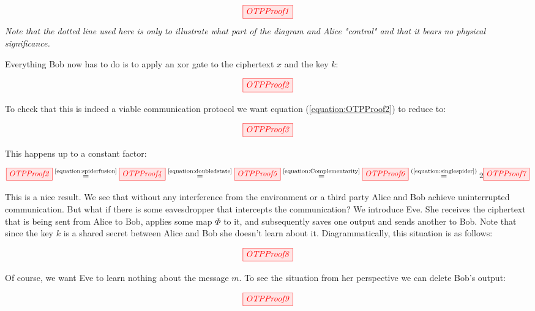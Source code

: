 \documentclass[]{article}
\newcommand{\equaltext}[1]{\ensuremath{\stackrel{\text{#1}}{=}}}
\begin{document}
\begin{equation}
	\tikzfig{OTPProof1}
\end{equation}
\textit{Note that the dotted line used here is only to illustrate what part of the diagram and Alice "control" and that it bears no physical significance.}


Everything Bob now has to do is to apply an xor gate to the ciphertext $x$ and the key $k$:

\begin{equation}
\label{equation:OTPProof2}
\tikzfig{OTPProof2}
\end{equation}

To check that this is indeed a viable communication protocol we want equation (\ref{equation:OTPProof2}) to reduce to:

\begin{equation}
\label{equation:OTPProof3}
\tikzfig{OTPProof3}
\end{equation}

This happens up to a constant factor:

\begin{equation}
\label{equation:OTPProoflong}
\tikzfig{OTPProof2}\equaltext{\ref{equation:spiderfusion}} \tikzfig{OTPProof4} \equaltext{\ref{equation:doubledstate}} \tikzfig{OTPProof5} \equaltext{\ref{equation:Complementarity}} \tikzfig{OTPProof6} \equaltext{(\ref{equation:singlespider})} 2 \tikzfig{OTPProof7}
\end{equation}

This is a nice result. We see that without any interference from the environment or a third party Alice and Bob achieve uninterrupted communication. But what if there is some eavesdropper that intercepts the communication? We introduce Eve. She receives the ciphertext that is being sent from Alice to Bob, applies some map $\Phi$ to it, and subsequently saves one output and sends another to Bob. Note that since the key $k$ is a shared secret between Alice and Bob she doesn't learn about it. Diagrammatically, this situation is as follows:

\begin{equation}
	\tikzfig{OTPProof8}
\end{equation}

Of course, we want Eve to learn nothing about the message $m$. To see the situation from her perspective we can delete Bob's output:

\begin{equation}
	\tikzfig{OTPProof9}
\end{equation}
\end{document}
